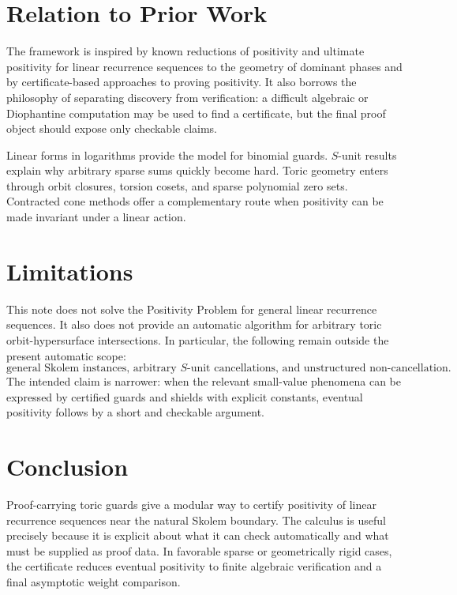 \documentclass[11pt]{article}
\begin{document}
\section{Relation to Prior Work}

The framework is inspired by known reductions of positivity and ultimate positivity for linear recurrence sequences to the geometry of dominant phases and by certificate-based approaches to proving positivity. It also borrows the philosophy of separating discovery from verification: a difficult algebraic or Diophantine computation may be used to find a certificate, but the final proof object should expose only checkable claims.

Linear forms in logarithms provide the model for binomial guards. \(S\)-unit results explain why arbitrary sparse sums quickly become hard. Toric geometry enters through orbit closures, torsion cosets, and sparse polynomial zero sets. Contracted cone methods offer a complementary route when positivity can be made invariant under a linear action.

\section{Limitations}

This note does not solve the Positivity Problem for general linear recurrence sequences. It also does not provide an automatic algorithm for arbitrary toric orbit-hypersurface intersections. In particular, the following remain outside the present automatic scope:
\[
\text{general Skolem instances, arbitrary }S\text{-unit cancellations, and unstructured non-cancellation.}
\]
The intended claim is narrower: when the relevant small-value phenomena can be expressed by certified guards and shields with explicit constants, eventual positivity follows by a short and checkable argument.

\section{Conclusion}

Proof-carrying toric guards give a modular way to certify positivity of linear recurrence sequences near the natural Skolem boundary. The calculus is useful precisely because it is explicit about what it can check automatically and what must be supplied as proof data. In favorable sparse or geometrically rigid cases, the certificate reduces eventual positivity to finite algebraic verification and a final asymptotic weight comparison.
\end{document}
